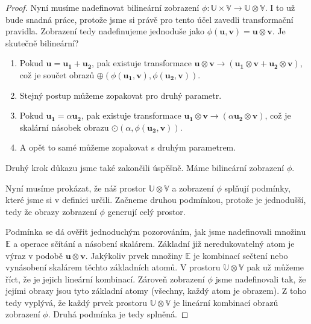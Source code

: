 \documentclass[a5paper,12pt]{amsbook}
\theoremstyle{definition}
\newcommand{\myvec}[1]{\bm{#1}}
\newcommand{\myspace}[1]{\mathbb{#1}}
\begin{document}
\begin{proof}
\medskip\noindent
Nyní musíme nadefinovat bilineární zobrazení $\phi: \myspace{U}\times\myspace{V}
\rightarrow\myspace{U}\otimes\myspace{V}$. I to už bude snadná práce, protože jsme si právě
pro tento účel zavedli transformační pravidla. Zobrazení tedy nadefinujeme jednoduše jako
$\phi(\myvec{u}, \myvec{v}) = \myvec{u}\otimes\myvec{v}$. Je skutečně bilineární?

\begin{enumerate}
\item Pokud $\myvec{u} = \myvec{u_1} + \myvec{u_2}$, pak existuje transformace
    $\myvec{u}\otimes\myvec{v} \rightarrow (\myvec{u_1}\otimes\myvec{v} 
    + \myvec{u_2}\otimes\myvec{v})$, což je součet obrazů
    $\oplus(\phi(\myvec{u_1}, \myvec{v}), \phi(\myvec{u_2}, \myvec{v}))$.
\item Stejný postup můžeme zopakovat pro druhý parametr.
\item Pokud $\myvec{u_1} = \alpha\myvec{u_2}$, pak existuje transformace
    $\myvec{u_1}\otimes\myvec{v} \rightarrow (\alpha\myvec{u_2}\otimes\myvec{v})$,
    což je skalární násobek obrazu $\odot(\alpha, \phi(\myvec{u_2}, \myvec{v}))$.
\item A opět to samé můžeme zopakovat s druhým parametrem.
\end{enumerate}
Druhý krok důkazu jsme také zakončili úspěšně. Máme bilineární zobrazení $\phi$.

\medskip\noindent
Nyní musíme prokázat, že náš prostor $\myspace{U}\otimes\myspace{V}$ a zobrazení
$\phi$ splňují podmínky, které jsme si v definici určili. Začneme druhou podmínkou,
protože je jednodušší, tedy že obrazy zobrazení $\phi$ generují celý prostor.

Podmínka se dá ověřit jednoduchým pozorováním, jak jsme nadefinovali množinu
$\myspace{E}$ a operace sčítání a násobení skalárem. Základní již neredukovatelný
atom je výraz v podobě $\myvec{u}\otimes\myvec{v}$. Jakýkoliv prvek množiny
$\myspace{E}$ je kombinací sečtení nebo vynásobení skalárem těchto základních atomů.
V prostoru $\myspace{U}\otimes\myspace{V}$ pak už můžeme říct, že je jejich lineární
kombinací. Zároveň zobrazení $\phi$ jsme nadefinovali tak, že jejími obrazy jsou
tyto základní atomy (všechny, každý atom je obrazem). Z toho tedy vyplývá, že každý
prvek prostoru $\myspace{U}\otimes\myspace{V}$ je lineární kombinací obrazů zobrazení
$\phi$. Druhá podmínka je tedy splněná.


\end{proof}
\end{document}
